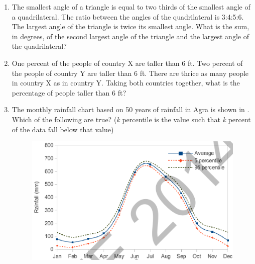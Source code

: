 \documentclass[journal,12pt,onecolumn]{IEEEtran}
\theoremstyle{remark}
\begin{document}
\begin{enumerate}
\item The smallest angle of a triangle is equal to two thirds of the smallest angle of a quadrilateral. The ratio between the angles of the quadrilateral is 3:4:5:6. The largest angle of the triangle is twice its smallest angle. What is the sum, in degrees, of the second largest angle of the triangle and the largest angle of the quadrilateral?

\item One percent of the people of country X are taller than 6 ft. Two percent of the people of country Y are taller than 6 ft. There are thrice as many people in country X as in country Y. Taking both countries together, what is the percentage of people taller than 6 ft?
\hfill{} \begin{enumerate}  \end{enumerate}

\item The monthly rainfall chart based on 50 years of rainfall in Agra is shown in .
Which of the following are true? (\textit{k} percentile is the value such that \textit{k} percent of the data fall below that value)
\begin{figure}[H]
\centering
 \caption{} \label{10} \includegraphics[width=0.8\columnwidth]{figs/q10.png}
\end{figure}


\end{enumerate}
\end{document}
